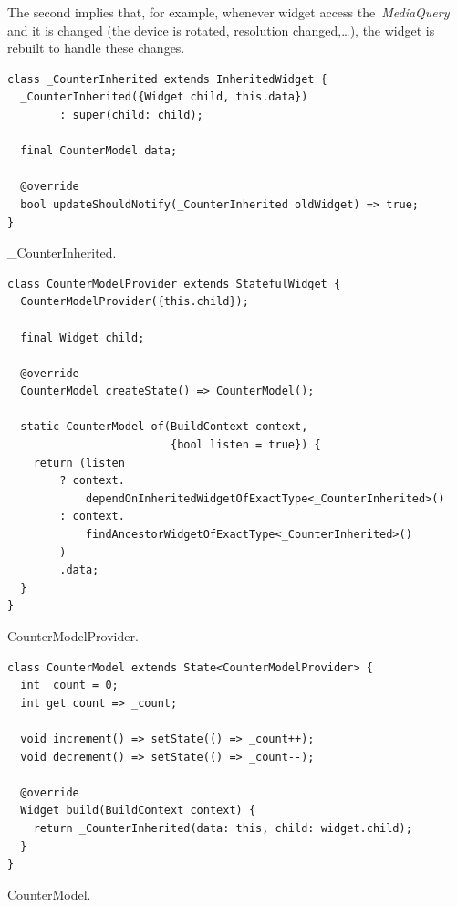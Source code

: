 The second implies that, for example, whenever widget access the~\textit{MediaQuery} and it is changed (the device is rotated, resolution changed,\ldots ), the widget is rebuilt to handle these changes. 

\begin{listing}[ht]
\begin{verbatim}
class _CounterInherited extends InheritedWidget {
  _CounterInherited({Widget child, this.data}) 
        : super(child: child);

  final CounterModel data;

  @override
  bool updateShouldNotify(_CounterInherited oldWidget) => true;
}
\end{verbatim}
\caption{\_CounterInherited.}
\label{listing:counter-inherited-counter-inherited}
\end{listing}

\begin{listing}[ht]
\begin{verbatim}
class CounterModelProvider extends StatefulWidget {
  CounterModelProvider({this.child});
  
  final Widget child;
  
  @override
  CounterModel createState() => CounterModel();

  static CounterModel of(BuildContext context, 
                         {bool listen = true}) {
    return (listen
        ? context.
            dependOnInheritedWidgetOfExactType<_CounterInherited>()
        : context.
            findAncestorWidgetOfExactType<_CounterInherited>()
        )
        .data;
  }
}
\end{verbatim}
\caption{CounterModelProvider.}
\label{listing:counter-inherited-model-provider}
\end{listing}

\begin{listing}[ht]
\begin{verbatim}
class CounterModel extends State<CounterModelProvider> {
  int _count = 0;
  int get count => _count;

  void increment() => setState(() => _count++);
  void decrement() => setState(() => _count--);

  @override
  Widget build(BuildContext context) {
    return _CounterInherited(data: this, child: widget.child);
  }
}
\end{verbatim}
\caption{CounterModel.}
\label{listing:counter-inherited-counter-model}
\end{listing}

